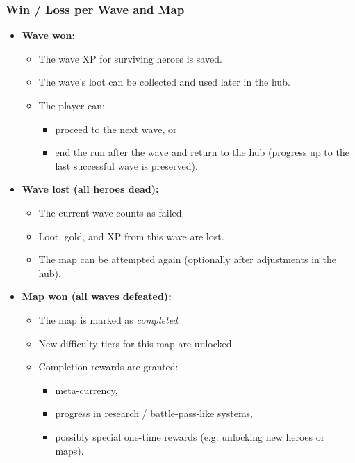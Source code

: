 \subsubsection*{Win / Loss per Wave and Map}

\begin{itemize}
	\item \textbf{Wave won:}
	\begin{itemize}
		\item The wave XP for surviving heroes is saved.
		\item The wave’s loot can be collected and used later in the hub.
		\item The player can:
		\begin{itemize}
			\item proceed to the next wave, or
			\item end the run after the wave and return to the hub (progress up to the last successful wave is preserved).
		\end{itemize}
	\end{itemize}
	\item \textbf{Wave lost (all heroes dead):}
	\begin{itemize}
		\item The current wave counts as failed.
		\item Loot, gold, and XP from this wave are lost.
		\item The map can be attempted again (optionally after adjustments in the hub).
	\end{itemize}
\end{itemize}

\begin{itemize}
	\item \textbf{Map won (all waves defeated):}
	\begin{itemize}
		\item The map is marked as \emph{completed}.
		\item New difficulty tiers for this map are unlocked.
		\item Completion rewards are granted:
		\begin{itemize}
			\item meta-currency,
			\item progress in research / battle-pass-like systems,
			\item possibly special one-time rewards (e.g. unlocking new heroes or maps).
		\end{itemize}
	\end{itemize}
\end{itemize}

